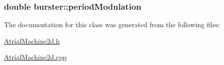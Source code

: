 \hypertarget{classburster_af62e107fa1dce71ff0c6aee967d40c6f}{
\subsubsection[{period\+Modulation}]{\setlength{\rightskip}{0pt plus 5cm}double burster\+::period\+Modulation}}\label{classburster_af62e107fa1dce71ff0c6aee967d40c6f}


The documentation for this class was generated from the following files\+:\begin{DoxyCompactItemize}
\item 
\hyperlink{_atrial_machine2d_8h}{Atrial\+Machine2d.\+h}\item 
\hyperlink{_atrial_machine2d_8cpp}{Atrial\+Machine2d.\+cpp}\end{DoxyCompactItemize}
